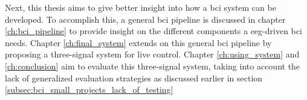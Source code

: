 Next, this thesis aims to give better insight into how a \gls{bci} system can be developed.
To accomplish this, a general \gls{bci} pipeline is discussed in chapter \ref{ch:bci_pipeline} to provide insight on the different components a \gls{eeg}-driven \gls{bci} needs.
Chapter \ref{ch:final_system} extends on this general \gls{bci} pipeline by proposing a three-signal system for live control.
Chapter \ref{ch:using_system} and \ref{ch:conclusion} aim to evaluate this three-signal system, taking into account the lack of generalized evaluation strategies as discussed earlier in section \ref{subsec:bci_small_projects_lack_of_testing}